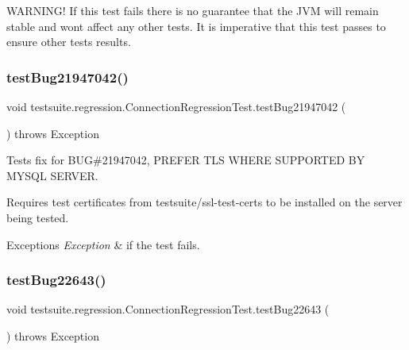W\+A\+R\+N\+I\+N\+G! If this test fails there is no guarantee that the J\+VM will remain stable and won\textquotesingle{}t affect any other tests. It is imperative that this test passes to ensure other tests results. \mbox{\label{classtestsuite_1_1regression_1_1_connection_regression_test_a071fe5a492bac37a1a3f0c9326d44ed8}} 
\subsubsection{\texorpdfstring{test\+Bug21947042()}{testBug21947042()}}
{\footnotesize\ttfamily void testsuite.\+regression.\+Connection\+Regression\+Test.\+test\+Bug21947042 (\begin{DoxyParamCaption}{ }\end{DoxyParamCaption}) throws Exception}

Tests fix for B\+UG\#21947042, P\+R\+E\+F\+ER T\+LS W\+H\+E\+RE S\+U\+P\+P\+O\+R\+T\+ED BY M\+Y\+S\+QL S\+E\+R\+V\+ER.

Requires test certificates from testsuite/ssl-\/test-\/certs to be installed on the server being tested.


\begin{DoxyExceptions}{Exceptions}
{\em Exception} & if the test fails. \\
\hline
\end{DoxyExceptions}
\mbox{\label{classtestsuite_1_1regression_1_1_connection_regression_test_aa286edfd17b719033e82cd5b359f2e4f}} 
\subsubsection{\texorpdfstring{test\+Bug22643()}{testBug22643()}}
{\footnotesize\ttfamily void testsuite.\+regression.\+Connection\+Regression\+Test.\+test\+Bug22643 (\begin{DoxyParamCaption}{ }\end{DoxyParamCaption}) throws Exception}

